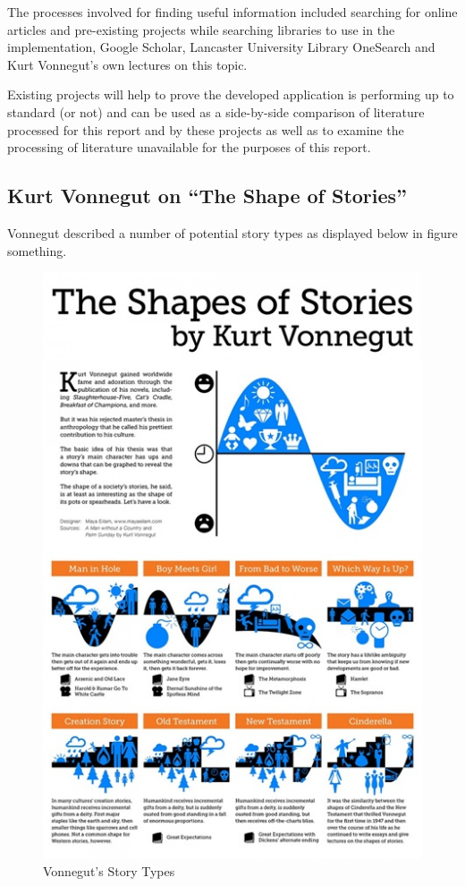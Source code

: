 \documentclass{article}
\begin{document}
        The processes involved for finding useful information included searching for online articles and pre-existing projects while searching libraries to use in the implementation, Google Scholar, Lancaster University Library OneSearch and Kurt Vonnegut’s own lectures on this topic.

        Existing projects will help to prove the developed application is performing up to standard (or not) and can be used as a side-by-side comparison of literature processed for this report and by these projects as well as to examine the processing of literature unavailable for the purposes of this report.
    \subsection{Kurt Vonnegut on ``The Shape of Stories''}
        Vonnegut described a number of potential story types as displayed below in figure something.
        \begin{figure}
            \centering
            \includegraphics{Misc/VonnegutShapes}
            \caption{Vonnegut's Story Types}
            \label{fig:storyTypes}
        \end{figure}
\end{document}
